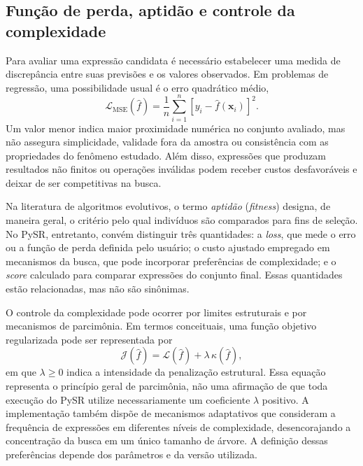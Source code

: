 \subsection{Função de perda, aptidão e controle da complexidade}
\label{subsec:sr_aptidao}

Para avaliar uma expressão candidata é necessário estabelecer uma medida de discrepância entre suas previsões e os valores observados. Em problemas de regressão, uma possibilidade usual é o erro quadrático médio,
\begin{equation}
\label{eq:sr_mse}
\mathcal{L}_{\mathrm{MSE}}(\widehat f)=
\frac{1}{n}\sum_{i=1}^{n}\left[y_i-\widehat f(\boldsymbol{x}_i)\right]^2.
\end{equation}
Um valor menor indica maior proximidade numérica no conjunto avaliado, mas não assegura simplicidade, validade fora da amostra ou consistência com as propriedades do fenômeno estudado. Além disso, expressões que produzam resultados não finitos ou operações inválidas podem receber custos desfavoráveis e deixar de ser competitivas na busca.

Na literatura de algoritmos evolutivos, o termo \textit{aptidão} (\textit{fitness}) designa, de maneira geral, o critério pelo qual indivíduos são comparados para fins de seleção. No PySR, entretanto, convém distinguir três quantidades: a \textit{loss}, que mede o erro ou a função de perda definida pelo usuário; o custo ajustado empregado em mecanismos da busca, que pode incorporar preferências de complexidade; e o \textit{score} calculado para comparar expressões do conjunto final. Essas quantidades estão relacionadas, mas não são sinônimas.

O controle da complexidade pode ocorrer por limites estruturais e por mecanismos de parcimônia. Em termos conceituais, uma função objetivo regularizada pode ser representada por
\begin{equation}
\label{eq:sr_parcimonia}
\mathcal{J}(\widehat f)=\mathcal{L}(\widehat f)
+\lambda\,\kappa(\widehat f),
\end{equation}
em que $\lambda\geq0$ indica a intensidade da penalização estrutural. Essa equação representa o princípio geral de parcimônia, não uma afirmação de que toda execução do PySR utilize necessariamente um coeficiente $\lambda$ positivo. A implementação também dispõe de mecanismos adaptativos que consideram a frequência de expressões em diferentes níveis de complexidade, desencorajando a concentração da busca em um único tamanho de árvore. A definição dessas preferências depende dos parâmetros e da versão utilizada.

